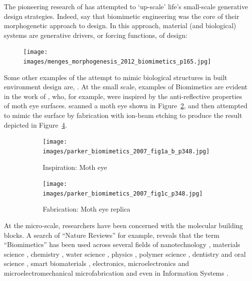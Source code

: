 The pioneering research of \citeauthor{menges_morphogenesis_2012} has attempted to `up-scale' life's small-scale generative design strategies. Indeed, \citeauthor{menges_morphogenesis_2012} say that biomimetic engineering was the core of their morphogenetic approach to design. In this approach, material (and biological) systems are generative drivers, or forcing functions, of design:

\begin{figure}[H]
    \centering
    \texttt{[image: images/menges\_morphogenesis\_2012\_biomimetics\_p165.jpg]}
    \caption{\cite[p.~165]{menges_morphogenesis_2012}}
    \label{fig:menges:morpho}
\end{figure}

Some other examples of the attempt to mimic biological structures in built environment design are, \cite{knippers_design_2012, krieg_computational_2012, erdine_biomimetic_2013, magna_nature_2013, castriotto_biomimetic_2019}. At the small scale, examples of Biomimetics are evident in the work of \citeauthor{parker_biomimetics_2007}, who, for example, were inspired by the anti-reflective properties of moth eye surfaces. \citeauthor{parker_biomimetics_2007} scanned a moth eye shown in Figure~\ref{fig:parker:2007:eye}, and then attempted to mimic the surface by fabrication with ion-beam etching to produce the result depicted in Figure~\ref{fig:parker:2007:replica}.

\begin{figure}[H]
    \centering
    \begin{subfigure}{.45\textwidth}
        \centering
        \texttt{[image: images/parker\_biomimetics\_2007\_fig1a\_b\_p348.jpg]}
        \caption{Inspiration: Moth eye}
        \label{fig:parker:2007:eye}
    \end{subfigure}
        \hspace{2em}%
    \begin{subfigure}{.45\textwidth}
        \centering
        \texttt{[image: images/parker\_biomimetics\_2007\_fig1c\_p348.jpg]}
        \caption{Fabrication: Moth eye replica}
        \label{fig:parker:2007:replica}    
    \end{subfigure}
    \caption{\cite[Fig.~1a-c, p.~348]{parker_biomimetics_2007}}
\end{figure}

At the micro-scale, researchers have been concerned with the molecular building blocks. A search of ``Nature Reviews'' for example, reveals that the term ``Biomimetics'' has been used across several fields of nanotechnology \citep{sarikaya_molecular_2003, parker_biomimetics_2007}, materials science \citep{ sanchez_biomimetism_2005, hou_interplay_2017}, chemistry \citep{wodrich_natural_2017, levin_biomimetic_2020}, water science \citep{goel_bibliometric_2021}, physics \citep{manna_harnessing_2022}, polymer science \citep{yoshida_development_2010,hirai_microstructured_2019}, dentistry and oral science \citep{pandya_enamel_2019}, smart biomaterials \citep{zhang_advanced_2018}, electronics, microelectronics and microelectromechanical microfabrication \citep{lothman_biomimetic_2014} and even in Information Systems \citep{kaufmann_biomimetics_2015}. 

